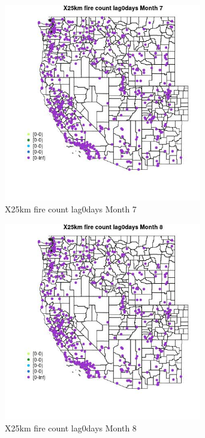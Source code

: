 \begin{figure} 
\centering  
\includegraphics[width=0.77\textwidth]{Code_Outputs/Report_ML_input_PM25_Step4_part_e_de_duplicated_aves_compiled_2019-05-14wNAs_MapObsMo7X25km_fire_count_lag0days.jpg} 
\caption{\label{fig:Report_ML_input_PM25_Step4_part_e_de_duplicated_aves_compiled_2019-05-14wNAsMapObsMo7X25km_fire_count_lag0days}X25km fire count lag0days Month 7} 
\end{figure} 
 

\begin{figure} 
\centering  
\includegraphics[width=0.77\textwidth]{Code_Outputs/Report_ML_input_PM25_Step4_part_e_de_duplicated_aves_compiled_2019-05-14wNAs_MapObsMo8X25km_fire_count_lag0days.jpg} 
\caption{\label{fig:Report_ML_input_PM25_Step4_part_e_de_duplicated_aves_compiled_2019-05-14wNAsMapObsMo8X25km_fire_count_lag0days}X25km fire count lag0days Month 8} 
\end{figure} 
 

